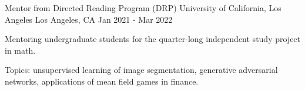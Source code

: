 \begin{cventries}
  \cventry
    {Mentor from Directed Reading Program (DRP)} %
    {University of California, Los Angeles} %
    {Los Angeles, CA} %
    {Jan 2021 - Mar 2022} %
    {
      \begin{cvitems} %
        \item Mentoring undergraduate students for the quarter-long independent study project in math.
        \item Topics: unsupervised learning of image segmentation, generative adversarial networks, applications of mean field games in finance.
      \end{cvitems}
    }

\end{cventries}
